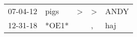 \begin{supertabular}{lllll}
 07-04-12 &   pigs &  \textgreater &  \textgreater &  ANDY \\
 12-31-18 &  *OE1* &               &             , &   haj \\
\end{supertabular}
